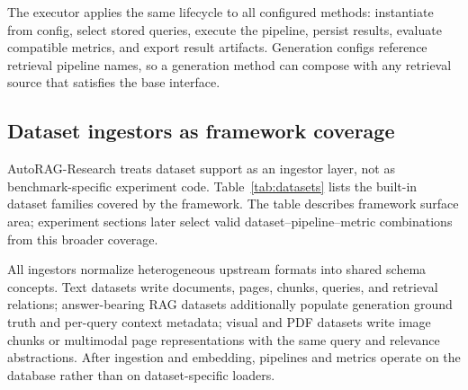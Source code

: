 \documentclass{article}
\newcommand{\framework}{AutoRAG-Research}
\begin{document}
The executor applies the same lifecycle to all configured methods: instantiate from config, select stored queries, execute the pipeline, persist results, evaluate compatible metrics, and export result artifacts. Generation configs reference retrieval pipeline names, so a generation method can compose with any retrieval source that satisfies the base interface.

\subsection{Dataset ingestors as framework coverage}

\framework{} treats dataset support as an ingestor layer, not as benchmark-specific experiment code. Table~\ref{tab:datasets} lists the built-in dataset families covered by the framework. The table describes framework surface area; experiment sections later select valid dataset--pipeline--metric combinations from this broader coverage.

All ingestors normalize heterogeneous upstream formats into shared schema concepts. Text datasets write documents, pages, chunks, queries, and retrieval relations; answer-bearing RAG datasets additionally populate generation ground truth and per-query context metadata; visual and PDF datasets write image chunks or multimodal page representations with the same query and relevance abstractions. After ingestion and embedding, pipelines and metrics operate on the database rather than on dataset-specific loaders.
\end{document}
